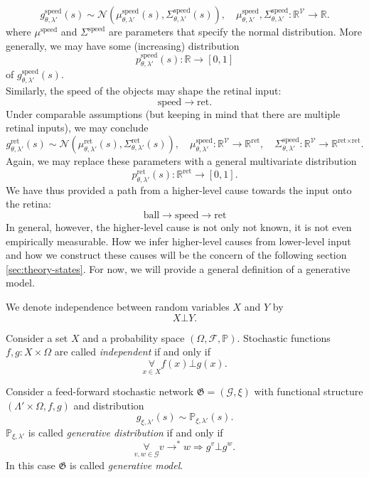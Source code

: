 \documentclass[a4paper,11pt]{report}
\begin{document}
\begin{Par}
\[
g^{\text{speed}}_{\theta,\lambda'}(s)\sim\mathcal{N}\left(\mu^{\text{speed}}_{\theta,\lambda'}(s),\Sigma^{\text{speed}}_{\theta,\lambda'}(s)\right),
\quad
\mu^{\text{speed}}_{\theta,\lambda'},\Sigma^{\text{speed}}_{\theta,\lambda'}:\mathbb{R}^{\mathcal{V}}\to\mathbb{R}.
\]
where $\mu^{\text{speed}}$ and $\Sigma^{\text{speed}}$ are parameters that specify the normal distribution. More generally, we may have some (increasing) distribution
\[
p^{\text{speed}}_{\theta,\lambda'}(s):\mathbb{R}\to [0,1]
\]
of $g^{\text{speed}}_{\theta,\lambda'}(s)$.\\
Similarly, the speed of the objects may shape the retinal input:
\[
\text{speed}\to\text{ret}.
\]
Under comparable assumptions (but keeping in mind that there are multiple retinal inputs), we may conclude
\[
g^{\text{ret}}_{\theta,\lambda'}(s)\sim\mathcal{N}\left(\mu^{\text{ret}}_{\theta,\lambda'}(s),\Sigma^{\text{ret}}_{\theta,\lambda'}(s)\right),
\quad
\mu^{\text{speed}}_{\theta,\lambda'}:\mathbb{R}^{\mathcal{V}}\to\mathbb{R}^{\text{ret}},
\quad
\Sigma^{\text{speed}}_{\theta,\lambda'}:\mathbb{R}^{\mathcal{V}}\to\mathbb{R}^{\text{ret}\times\text{ret}}.
\]
Again, we may replace these parameters with a general multivariate distribution
\[
p^{\text{ret}}_{\theta,\lambda'}(s):\mathbb{R}^{\text{ret}}\to[0,1].
\]
We have thus provided a path from a higher-level cause towards the input onto the retina:
\[
\text{ball}\to\text{speed}\to\text{ret}
\]
In general, however, the higher-level cause is not only not known, it is not even empirically measurable. How we infer higher-level causes from lower-level input and how we construct these causes will be the concern of the following section \ref{sec:theory-states}. For now, we will provide a general definition of a generative model.
\end{Par}

\begin{Not}
We denote independence between random variables $X$ and $Y$ by
\[
X\bot Y.
\]
\end{Not}

\begin{Def}
Consider a set $X$ and a probability space $(\Omega,\mathcal{F},\mathbb{P})$. Stochastic functions $f,g:X\times\Omega$ are called \emph{independent} if and only if
\[
\underset{x\in X}{\forall}f(x)\bot g(x).
\]
\end{Def}

\begin{Def}\label{def:generative-model}
Consider a feed-forward stochastic network $\mathfrak{G}=\left(\mathcal{G},\xi\right)$ with functional structure $(\Lambda'\times\Omega,f,g)$ and distribution
\[
g_{\xi,\lambda'}(s)\sim\mathbb{P}_{\xi,\lambda'}(s).
\]
$\mathbb{P}_{\xi,\lambda'}$ is called \emph{generative distribution} if and only if
\[
\underset{v,w\in\mathcal{G}}{\forall}v\to^* w\Rightarrow g^v\bot g^w.
\]
In this case $\mathfrak{G}$ is called \emph{generative model}.
\end{Def}
\end{document}
